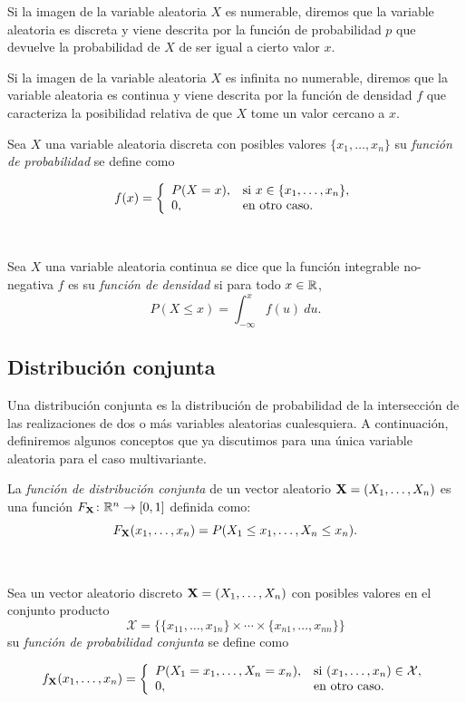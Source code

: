 \documentclass[oneside,openright,titlepage,numbers=noenddot,openany,headinclude,footinclude=true,
cleardoublepage=empty,abstractoff,BCOR=5mm,paper=a4,fontsize=12pt,main=spanish]{scrreprt}
\begin{document}
Si la imagen de la variable aleatoria $X$ es numerable, diremos que la variable aleatoria es discreta y viene descrita por la función de probabilidad $p$ que devuelve la probabilidad de $X$ de ser igual a cierto valor $x$. 

Si la imagen de la variable aleatoria $X$ es infinita no numerable, diremos que la variable aleatoria es continua y viene descrita por la función de densidad $f$ que caracteriza la posibilidad relativa de que $X$ tome un valor cercano a $x$.\\

\begin{definition}
Sea $X$ una variable aleatoria discreta con posibles valores $\{x_1,\dots,x_n\}$ su \textit{función de probabilidad} se define como 

$$f(x)= \left \{
\begin{array}{l l}
P(X=x), & \mbox{si } x\in \{x_1,\dots,x_n\}, \\
0, & \mbox{en otro caso}.
\end{array}
\right.$$
\end{definition}\

\begin{definition}
Sea $X$ una variable aleatoria continua se dice que la función integrable no-negativa $f$ es su \textit{función de densidad} si para todo $x \in \mathbb{R}$, $$P(X\leq x)=\int_{-\infty}^x f(u) \ du.$$
\end{definition}

\subsection{Distribución conjunta}

Una distribución conjunta es la distribución de probabilidad de la intersección de las realizaciones de dos o más variables aleatorias cualesquiera. A continuación, definiremos algunos conceptos que ya discutimos para una única variable aleatoria para el caso multivariante.\\

\begin{definition}
La \textit{función de distribución conjunta} de un vector aleatorio $\textbf{X}=(X_1,\dots,X_n)$ es una función $F_{\textbf{X}}\colon \mathbb{R}^n \to [0,1]$ definida como: $$F_{\textbf{X}}(x_1,\dots,x_n)=P(X_1\leq x_1,\dots,X_n\leq x_n).$$
\end{definition}\

\begin{definition}
Sea un vector aleatorio discreto $\textbf{X}=(X_1,\dots,X_n)$ con posibles valores en el conjunto producto $$\mathcal{X}=\Big\lbrace \{x_{11},\dots,x_{1n}\}\times \cdots \times \{x_{n1},\dots,x_{nn}\} \Big\rbrace$$ su \textit{función de probabilidad conjunta} se define como

$$f_{\textbf{X}}(x_1,\dots,x_n)= \left \{
\begin{array}{l l}
P(X_1=x_1,\dots,X_n=x_n), & \mbox{si } (x_1,\dots,x_n)\in \mathcal{X}, \\
0, & \mbox{en otro caso}.
\end{array}
\right.$$
\end{definition}\
\end{document}
